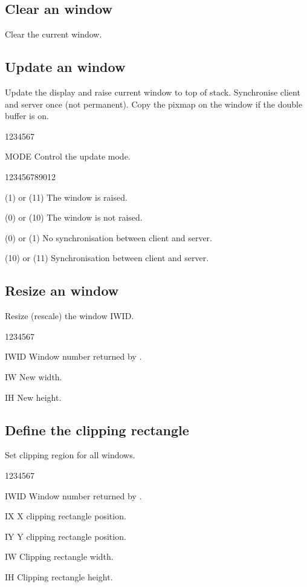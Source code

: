 \subsection{Clear an  window}
\Action
Clear the current window.
%
\subsection{Update an  window}
\Action
Update the display and raise current window to top of stack.
Synchronise client and server once (not permanent).
Copy the pixmap on the window if the double buffer is on.
\begin{DLtt}{1234567}
\item[MODE] Control the update mode.
\begin{DLtt}{123456789012}
\item[(1) or (11)] The window is raised.
\item[(0) or (10)] The window is not raised.
\item[(0) or (1)]  No synchronisation between client and server.
\item[(10) or (11)] Synchronisation between client and server.
\end{DLtt}
\end{DLtt}
%
\subsection{Resize an  window}
\Action
Resize (rescale) the  window IWID.
\Pdesc
\begin{DLtt}{1234567}
\item[IWID] Window number returned by .
\item[IW] New width.
\item[IH] New height.
\end{DLtt}

\newpage

\subsection{Define the  clipping rectangle}
\Action
Set clipping region for all windows.
\Pdesc
\begin{DLtt}{1234567}
\item[IWID] Window number returned by .
\item[IX] X clipping rectangle position.
\item[IY] Y clipping rectangle position.
\item[IW] Clipping rectangle width.
\item[IH] Clipping rectangle height.
\end{DLtt}
%
